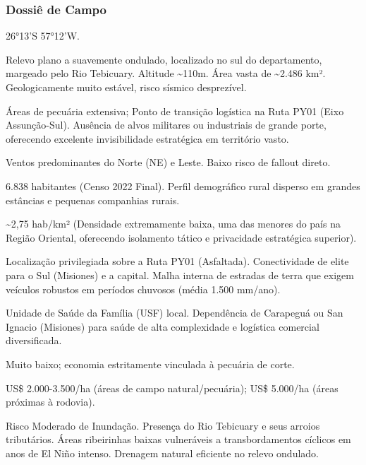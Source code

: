 \subsubsection{Dossiê de Campo}
\begin{description}[style=nextline,leftmargin=0.5cm,font=\bfseries]
\item[Coordenadas]  26°13'S 57°12'W.
\item[Topografia]  Relevo plano a suavemente ondulado, localizado no sul do departamento, margeado pelo Rio Tebicuary. Altitude \textasciitilde 110m. Área vasta de \textasciitilde 2.486 km². Geologicamente muito estável, risco sísmico desprezível.
\item[Alvos Estratégicos]  Áreas de pecuária extensiva; Ponto de transição logística na Ruta PY01 (Eixo Assunção-Sul). Ausência de alvos militares ou industriais de grande porte, oferecendo excelente invisibilidade estratégica em território vasto.
\item[Fallout]  Ventos predominantes do Norte (NE) e Leste. Baixo risco de fallout direto.
\item[População]  6.838 habitantes (Censo 2022 Final). Perfil demográfico rural disperso em grandes estâncias e pequenas companhias rurais.
\item[Densidade]  \textasciitilde 2,75 hab/\allowbreak km² (Densidade extremamente baixa, uma das menores do país na Região Oriental, oferecendo isolamento tático e privacidade estratégica superior).
\item[Vias de Acesso]  Localização privilegiada sobre a Ruta PY01 (Asfaltada). Conectividade de elite para o Sul (Misiones) e a capital. Malha interna de estradas de terra que exigem veículos robustos em períodos chuvosos (média 1.500 mm/\allowbreak ano).
\item[Serviços]  Unidade de Saúde da Família (USF) local. Dependência de Carapeguá ou San Ignacio (Misiones) para saúde de alta complexidade e logística comercial diversificada.
\item[Custo de Vida]  Muito baixo; economia estritamente vinculada à pecuária de corte.
\item[Preço da Terra]  US\$ 2.000-3.500/\allowbreak ha (áreas de campo natural/\allowbreak pecuária); US\$ 5.000/\allowbreak ha (áreas próximas à rodovia).
\item[Hidrologia]  Risco Moderado de Inundação. Presença do Rio Tebicuary e seus arroios tributários. Áreas ribeirinhas baixas vulneráveis a transbordamentos cíclicos em anos de El Niño intenso. Drenagem natural eficiente no relevo ondulado.

\end{description}

